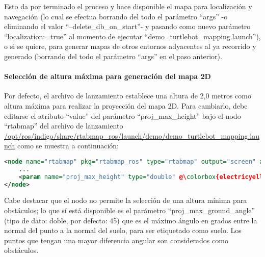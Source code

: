 Esto da por terminado el proceso y hace disponible el mapa para localización y navegación (lo cual se efectua borrando del todo el parámetro ``args'' -o eliminando el valor ``--delete\_db\_on\_start''- y pasando como nuevo parámetro ``localization:=true'' al momento de ejecutar ``demo\_turtlebot\_mapping.launch''), o si se quiere, para generar mapas de otros entornos adyacentes al ya recorrido y generado (borrando del todo el parámetro ``args'' en el paso anterior).

\paragraph{Selección de altura máxima para generación del mapa 2D}

Por defecto, el archivo de lanzamiento establece una altura de 2,0 metros como altura máxima para realizar la proyección del mapa 2D. Para cambiarlo, debe editarse el atributo ``value'' del parámetro ``proj\_max\_height'' bajo el nodo ``rtabmap'' del archivo de lanzamiento \url{/opt/ros/indigo/share/rtabmap_ros/launch/demo/demo_turtlebot_mapping.launch} como se muestra a continuación:

\begin{blackcodebox}
\begin{lstlisting}[escapechar=@, language=xml]
<node name="rtabmap" pkg="rtabmap_ros" type="rtabmap" output="screen" args="$(arg args)">
    ...
    <param name="proj_max_height" type="double" @\colorbox{electricyellow}{value=``2.0''}@ />
</node>
\end{lstlisting}
\end{blackcodebox}

Cabe destacar que el nodo no permite la selección de una altura mínima para obstáculos; lo que sí está disponible es el parámetro ``proj\_max\_ground\_angle'' (tipo de dato: doble, por defecto: 45) que es el máximo ángulo en grados entre la normal del punto a la normal del suelo, para ser etiquetado como suelo. Los puntos que tengan una mayor diferencia angular son considerados como obstáculos.